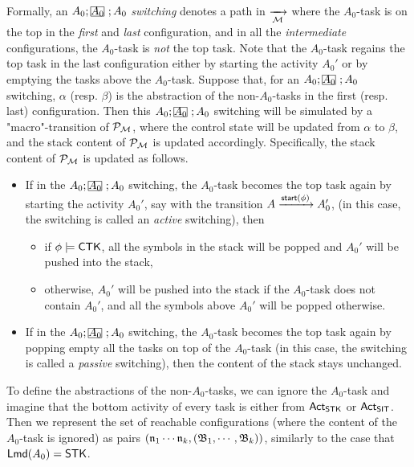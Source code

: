 Formally, an $A_0;\mhcancel{A_0};A_0$ \emph{switching} denotes a path in $\xrightarrow[{\mathcal{M} }]{}$ where the $A_0$-task is on the top in the \emph{first} and \emph{last} configuration, and in all the \emph{intermediate} configurations, the $A_0$-task is \emph{not} the top task. 
%
Note that the $A_0$-task regains the top task in the last configuration either by starting the activity $A_0'$ or by emptying the tasks above the $A_0$-task. Suppose that, for an $A_0;\mhcancel{A_0};A_0$ switching, $\alpha$ (resp. $\beta$) is the abstraction of the non-$A_0$-tasks in the first (resp. last) configuration. 
Then this $A_0;\mhcancel{A_0};A_0$ switching will be simulated by a "macro"-transition of ${\mathcal{P} }_{{\mathcal{M} }}$, where the control state will be updated from $\alpha$ to $\beta$, and the stack content of ${\mathcal{P} }_{{\mathcal{M} }}$ is updated accordingly. 
Specifically, the stack content of ${\mathcal{P} }_{{\mathcal{M} }}$ is updated as follows. 
\begin{itemize}
    \item If in the $A_0; \mhcancel{A_0}; A_0$ switching, the $A_0$-task becomes the top task again by starting the activity $A_0'$, say with the transition $A\xrightarrow{{\mathsf{start} }(\phi)}A_0'$, (in this case, the switching is called an \emph{active} switching), then
    \begin{itemize}
        \item if $\phi \models {\sf CTK}$, all the symbols in the stack will be popped and $A_0'$ will be pushed into the stack,
        \item otherwise, $A_0'$ will be pushed into the stack if the $A_0$-task does not contain $A_0'$, and all the symbols above $A_0'$ will be popped otherwise.
    \end{itemize}
%
    \item If in the $A_0; \mhcancel{A_0}; A_0$ switching, the $A_0$-task becomes the top task again by popping empty all the tasks on top of the $A_0$-task (in this case, the switching is called a \emph{passive} switching), then the content of the stack stays unchanged.
%        
\end{itemize}

To define the abstractions of the non-$A_0$-tasks, we can ignore the $A_0$-task and imagine that the bottom activity of every task is either from ${\sf Act}_{{\sf STK}}$ or ${\sf Act}_{{\sf SIT}}$.  Then we represent the set of reachable configurations (where the content of the $A_0$-task is ignored) as pairs $(\mathfrak{n}_1 \cdots \mathfrak{n}_k, ({\mathfrak{B} }_1, \cdots, {\mathfrak{B} }_k))$, similarly to the case that ${\sf Lmd}(A_0) = {\sf STK}$. 

